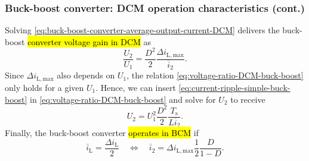 \begin{frame}
    \frametitle{Buck-boost converter: DCM operation characteristics (cont.)}
    Solving \eqref{eq:buck-boost-converter-average-output-current-DCM} delivers the buck-boost \hl{converter voltage gain in DCM} as
    \begin{equation}
        \frac{U_2}{U_1} = \frac{D^2}{2} \frac{\Delta i_\mathrm{L,max}}{\overline{i}_2}.
        \label{eq:voltage-ratio-DCM-buck-boost}
    \end{equation}
    \pause%
    Since $\Delta i_\mathrm{L,max}$ also depends on $U_1$, the relation \eqref{eq:voltage-ratio-DCM-buck-boost} only holds for a given $U_1$. Hence, we can insert \eqref{eq:current-ripple-simple-buck-boost} in \eqref{eq:voltage-ratio-DCM-buck-boost} and solve for $U_2$ to receive
    \begin{equation}
        U_2= U_1^2 \frac{D^2}{2} \frac{T_\mathrm{s}}{L \overline{i}_2}.
    \end{equation}
    \pause%
    Finally, the buck-boost converter \hl{operates in BCM} if
    \begin{equation}
        \overline{i}_\mathrm{L} = \frac{\Delta i_\mathrm{L}}{2} \quad \Leftrightarrow \quad  \overline{i}_2 = \Delta i_\mathrm{L,max} \frac{1}{2} \frac{D}{1-D}. 
    \end{equation}
\end{frame}

